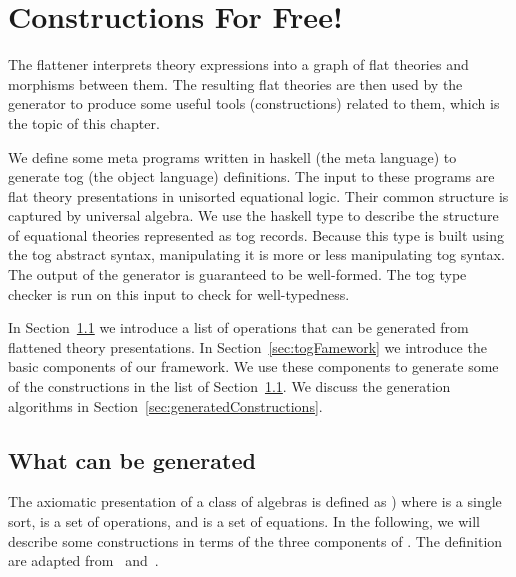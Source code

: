 \chapter{Constructions For Free!}
\label{ch:generation}

The flattener interprets theory expressions into a graph of flat theories and morphisms between them. The resulting flat theories are then used by the generator to produce some useful tools (constructions) related to them, which is the topic of this chapter. 

We define some meta programs written in haskell (the meta language) to generate tog (the object language) definitions. 
The input to these programs are flat theory presentations in unisorted equational logic. Their common structure is captured by universal algebra. We use the haskell type  to describe the structure of equational theories represented as tog records. Because this type is built using the tog abstract syntax, manipulating it is more or less manipulating tog syntax. The output of the generator is guaranteed to be well-formed. The tog type checker is run on this input to check for well-typedness. 

In Section~\ref{sec:toBeGenerated} we introduce a list of operations that can be generated from flattened theory presentations. In Section~\ref{sec:togFamework} we introduce the basic components of our framework. We use these components to generate some of the constructions in the list of Section~\ref{sec:toBeGenerated}. We discuss the generation algorithms in Section~\ref{sec:generatedConstructions}. 

\section{What can be generated}
\label{sec:toBeGenerated}

The axiomatic presentation of a class of algebras is defined as ) where  is a single sort,  is a set of operations, and  is a set of equations.  In the following, we will describe some constructions in terms of the three components of . The definition are adapted from~\cite{ehrig1985fundamentals} and~\cite{handbook1993Maibaum}.  

